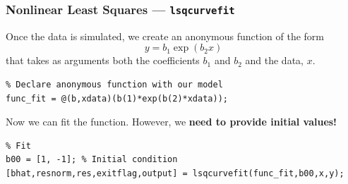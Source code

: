 \documentclass[11pt,xcolor={svgnames},aspectratio=169,usepdftitle=false]{beamer}
\let\toneitemize\itemize
\let\ttwoitemize\enditemize
\renewenvironment{itemize}{\toneitemize\addtolength{\itemsep}{0.7\baselineskip}}{\ttwoitemize}
\begin{document}
\begin{frame}[fragile]
  \frametitle{Nonlinear Least Squares --- \texttt{lsqcurvefit}}
\begin{itemize}
  \item Once the data is simulated, we create an anonymous function of the form
  \[
  y = b_1\exp(b_2 x)  
  \]
  that takes as arguments both the coefficients $b_1$ and $b_2$ and the data, $x$.
\end{itemize}
\begin{lstlisting}
% Declare anonymous function with our model
func_fit = @(b,xdata)(b(1)*exp(b(2)*xdata));
\end{lstlisting}
\begin{itemize}
  \item Now we can fit the function. However, we \alert{\textbf{need to provide initial values!}}
\end{itemize}
\begin{lstlisting}
% Fit
b00 = [1, -1]; % Initial condition
[bhat,resnorm,res,exitflag,output] = lsqcurvefit(func_fit,b00,x,y);
\end{lstlisting}
\end{frame}
\end{document}

